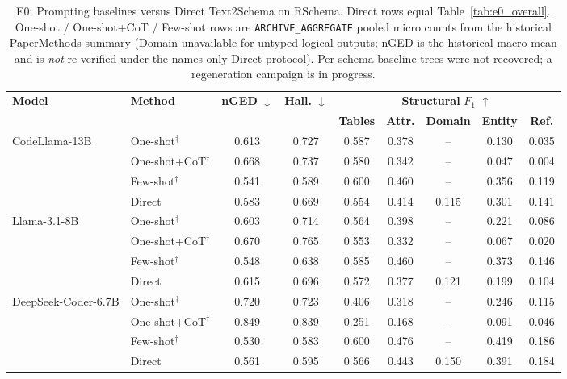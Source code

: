 \begin{table}[t]
\centering
\small
\setlength{\tabcolsep}{3pt}
\renewcommand{\arraystretch}{1.0}
\caption{E0: Prompting baselines versus Direct Text2Schema on RSchema.
Direct rows equal Table~\ref{tab:e0_overall}.
One-shot / One-shot+CoT / Few-shot rows are \texttt{ARCHIVE\_AGGREGATE}
pooled micro counts from the historical PaperMethods summary
(Domain unavailable for untyped logical outputs; nGED is the historical
macro mean and is \emph{not} re-verified under the names-only Direct protocol).
Per-schema baseline trees were not recovered; a regeneration campaign is in progress.}
\label{tab:e0_baselines}
\begin{tabular*}{\textwidth}
{@{\extracolsep{\fill}}llccccccc@{}}
\toprule
\multirow{2}{*}{\textbf{Model}}
& \multirow{2}{*}{\textbf{Method}}
& \multirow{2}{*}{\textbf{nGED} $\downarrow$}
& \multirow{2}{*}{\textbf{Hall.} $\downarrow$}
& \multicolumn{5}{c}{\textbf{Structural} $F_1$ $\uparrow$} \\
\cmidrule(lr){5-9}
& & & &
\textbf{Tables} & \textbf{Attr.}
& \textbf{Domain} & \textbf{Entity}
& \textbf{Ref.} \\
\midrule
\multirow{4}{*}{CodeLlama-13B}
 & One-shot$^{\dagger}$ & 0.613 & 0.727 & 0.587 & 0.378 & -- & 0.130 & 0.035 \\
 & One-shot+CoT$^{\dagger}$ & 0.668 & 0.737 & 0.580 & 0.342 & -- & 0.047 & 0.004 \\
 & Few-shot$^{\dagger}$ & 0.541 & 0.589 & 0.600 & 0.460 & -- & 0.356 & 0.119 \\
 & Direct & 0.583 & 0.669 & 0.554 & 0.414 & 0.115 & 0.301 & 0.141 \\
\midrule
\multirow{4}{*}{Llama-3.1-8B}
 & One-shot$^{\dagger}$ & 0.603 & 0.714 & 0.564 & 0.398 & -- & 0.221 & 0.086 \\
 & One-shot+CoT$^{\dagger}$ & 0.670 & 0.765 & 0.553 & 0.332 & -- & 0.067 & 0.020 \\
 & Few-shot$^{\dagger}$ & 0.548 & 0.638 & 0.585 & 0.460 & -- & 0.373 & 0.146 \\
 & Direct & 0.615 & 0.696 & 0.572 & 0.377 & 0.121 & 0.199 & 0.104 \\
\midrule
\multirow{4}{*}{DeepSeek-Coder-6.7B}
 & One-shot$^{\dagger}$ & 0.720 & 0.723 & 0.406 & 0.318 & -- & 0.246 & 0.115 \\
 & One-shot+CoT$^{\dagger}$ & 0.849 & 0.839 & 0.251 & 0.168 & -- & 0.091 & 0.046 \\
 & Few-shot$^{\dagger}$ & 0.530 & 0.583 & 0.600 & 0.476 & -- & 0.419 & 0.186 \\
 & Direct & 0.561 & 0.595 & 0.566 & 0.443 & 0.150 & 0.391 & 0.184 \\
\bottomrule
\end{tabular*}
\end{table}

